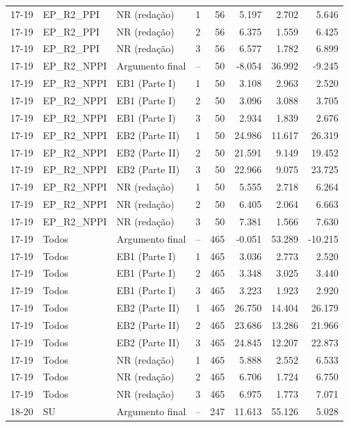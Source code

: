 \begin{longtable}{lllcrrrr}
17-19 & EP\_R2\_PPI & NR (redação) & 1 & 56 & 5.197 & 2.702 & 5.646 \\
17-19 & EP\_R2\_PPI & NR (redação) & 2 & 56 & 6.375 & 1.559 & 6.425 \\
17-19 & EP\_R2\_PPI & NR (redação) & 3 & 56 & 6.577 & 1.782 & 6.899 \\
17-19 & EP\_R2\_NPPI & Argumento final & -- & 50 & -8.054 & 36.992 & -9.245 \\
17-19 & EP\_R2\_NPPI & EB1 (Parte I) & 1 & 50 & 3.108 & 2.963 & 2.520 \\
17-19 & EP\_R2\_NPPI & EB1 (Parte I) & 2 & 50 & 3.096 & 3.088 & 3.705 \\
17-19 & EP\_R2\_NPPI & EB1 (Parte I) & 3 & 50 & 2.934 & 1.839 & 2.676 \\
17-19 & EP\_R2\_NPPI & EB2 (Parte II) & 1 & 50 & 24.986 & 11.617 & 26.319 \\
17-19 & EP\_R2\_NPPI & EB2 (Parte II) & 2 & 50 & 21.591 & 9.149 & 19.452 \\
17-19 & EP\_R2\_NPPI & EB2 (Parte II) & 3 & 50 & 22.966 & 9.075 & 23.725 \\
17-19 & EP\_R2\_NPPI & NR (redação) & 1 & 50 & 5.555 & 2.718 & 6.264 \\
17-19 & EP\_R2\_NPPI & NR (redação) & 2 & 50 & 6.405 & 2.064 & 6.663 \\
17-19 & EP\_R2\_NPPI & NR (redação) & 3 & 50 & 7.381 & 1.566 & 7.630 \\
17-19 & Todos & Argumento final & -- & 465 & -0.051 & 53.289 & -10.215 \\
17-19 & Todos & EB1 (Parte I) & 1 & 465 & 3.036 & 2.773 & 2.520 \\
17-19 & Todos & EB1 (Parte I) & 2 & 465 & 3.348 & 3.025 & 3.440 \\
17-19 & Todos & EB1 (Parte I) & 3 & 465 & 3.223 & 1.923 & 2.920 \\
17-19 & Todos & EB2 (Parte II) & 1 & 465 & 26.750 & 14.404 & 26.179 \\
17-19 & Todos & EB2 (Parte II) & 2 & 465 & 23.686 & 13.286 & 21.966 \\
17-19 & Todos & EB2 (Parte II) & 3 & 465 & 24.845 & 12.207 & 22.873 \\
17-19 & Todos & NR (redação) & 1 & 465 & 5.888 & 2.552 & 6.533 \\
17-19 & Todos & NR (redação) & 2 & 465 & 6.706 & 1.724 & 6.750 \\
17-19 & Todos & NR (redação) & 3 & 465 & 6.975 & 1.773 & 7.071 \\
\midrule
18-20 & SU & Argumento final & -- & 247 & 11.613 & 55.126 & 5.028 \\

\end{longtable}

